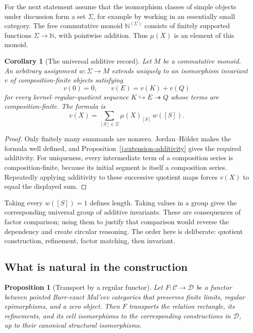 \documentclass[11pt]{article}
\newtheorem{proposition}[theorem]{Proposition}
\newtheorem{corollary}[theorem]{Corollary}
\theoremstyle{definition}
\theoremstyle{remark}\newtheorem{remark}[theorem]{Remark}
\begin{document}
For the next statement assume that the isomorphism classes of simple
objects under discussion form a set $\Sigma$, for example by working in
an essentially small category.  The free commutative monoid
$\mathbb N^{(\Sigma)}$ consists of finitely supported functions
$\Sigma\to\mathbb N$, with pointwise addition.  Thus $\mu(X)$ is an
element of this monoid.

\begin{corollary}[The universal additive record]
\label{j:universal-invariant}
\label{j:universal-monoid}
Let $M$ be a commutative monoid.  An arbitrary assignment $w:\Sigma\to M$
extends uniquely to an isomorphism invariant $v$ of composition-finite
objects satisfying
\[
 v(0)=0,\qquad v(E)=v(K)+v(Q)
\]
for every kernel--regular-quotient sequence $K\hookrightarrow
E\twoheadrightarrow Q$ whose terms are composition-finite.  The formula is
\[
                 v(X)=\sum_{[S]\in\Sigma}\mu(X)_{[S]}\,w([S]).
\]
\end{corollary}

\begin{proof}
Only finitely many summands are nonzero.  Jordan--H\"older makes the
formula well defined, and Proposition~\ref{j:extension-additivity} gives
the required additivity.  For uniqueness, every intermediate term of a
composition series is composition-finite, because its initial segment
is itself a composition series.  Repeatedly applying additivity to these
successive quotient maps forces $v(X)$ to equal the displayed sum.
\end{proof}

Taking every $w([S])=1$ defines length.  Taking values in a group gives
the corresponding universal group of additive invariants.  These are
consequences of factor comparison; using them to justify that comparison
would reverse the dependency and create circular reasoning.  The order
here is deliberate: quotient construction, refinement, factor matching,
then invariant.

\subsection{What is natural in the construction}

\begin{proposition}[Transport by a regular functor]
\label{r:functoriality}
Let $F:\mathcal C\to\mathcal D$ be a functor between pointed Barr-exact
Mal'cev categories that preserves finite limits, regular epimorphisms,
and a zero object.  Then $F$ transports the relation rectangle, its
refinements, and its cell isomorphisms to the corresponding constructions
in $\mathcal D$, up to their canonical structural isomorphisms.
\end{proposition}
\end{document}
